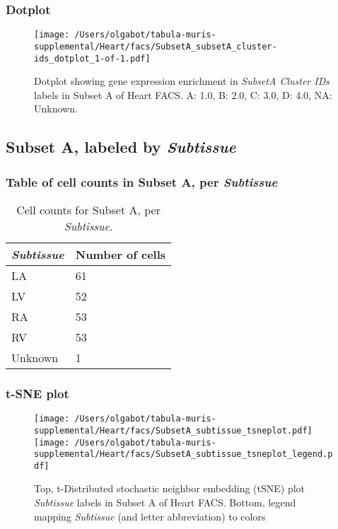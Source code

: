 \clearpage

\subsubsection{Dotplot}
\begin{figure}[h]
\centering
\texttt{[image: /Users/olgabot/tabula-muris-supplemental/Heart/facs/SubsetA\_subsetA\_cluster-ids\_dotplot\_1-of-1.pdf]}

\caption{ Dotplot  showing gene expression enrichment in \emph{SubsetA Cluster IDs} labels in Subset A of Heart FACS. A: 1.0, B: 2.0, C: 3.0, D: 4.0, NA: Unknown.}
\end{figure}


\clearpage

\subsection{Subset A, labeled by \emph{Subtissue}}
\subsubsection{Table of cell counts in Subset A, per \emph{Subtissue}}\begin{table}[h]
\centering
\label{my-label}
\begin{tabular}{@{}ll@{}}
\toprule

\emph{Subtissue}& Number of cells \\ \midrule
LA & 61 \\

LV & 52 \\

RA & 53 \\

RV & 53 \\

Unknown & 1 \\
\bottomrule
\end{tabular}
\caption{Cell counts for Subset A, per \emph{Subtissue}.}
\end{table}

\clearpage
\subsubsection{t-SNE plot}
\begin{figure}[h]
\centering
\texttt{[image: /Users/olgabot/tabula-muris-supplemental/Heart/facs/SubsetA\_subtissue\_tsneplot.pdf]}
\texttt{[image: /Users/olgabot/tabula-muris-supplemental/Heart/facs/SubsetA\_subtissue\_tsneplot\_legend.pdf]}
\caption{Top, t-Distributed stochastic neighbor embedding (tSNE) plot  \emph{Subtissue} labels in Subset A of Heart FACS. Bottom, legend mapping \emph{Subtissue} (and letter abbreviation) to colors}
\end{figure}


